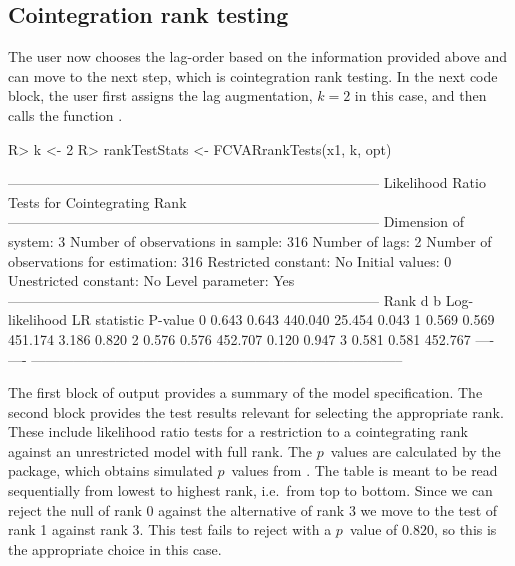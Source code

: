 \documentclass[article]{jss}
\newcommand{\fct}[1]{\code{#1()}}
\begin{document}
\subsection{Cointegration rank testing}

The user now chooses the lag-order based on the information provided above and can move to the next step, which is cointegration rank testing. 
In the next code block, the user first assigns the lag augmentation, $k = 2$ in this case, and then calls the function \fct{FCVARrankTests}. 


\begin{CodeChunk} 
\begin{CodeInput}
R> k <- 2
R> rankTestStats <- FCVARrankTests(x1, k, opt)
\end{CodeInput}
\begin{CodeOutput}
--------------------------------------------------------------------------------
             Likelihood Ratio Tests for Cointegrating Rank                               
--------------------------------------------------------------------------------
Dimension of system:       3     Number of observations in sample:          316 
Number of lags:            2     Number of observations for estimation:     316 
Restricted constant:      No     Initial values:                              0
Unestricted constant:     No     Level parameter:                           Yes
--------------------------------------------------------------------------------
Rank     d      b     Log-likelihood   LR statistic   P-value
 0     0.643  0.643          440.040         25.454     0.043
 1     0.569  0.569          451.174          3.186     0.820
 2     0.576  0.576          452.707          0.120     0.947
 3     0.581  0.581          452.767           ----      ----
--------------------------------------------------------------------------------
\end{CodeOutput}
\end{CodeChunk} 


The first block of output provides a summary of the model specification. The second block provides the test results relevant for selecting the appropriate rank. 
These include likelihood ratio tests for a restriction to a cointegrating rank against an unrestricted model with full rank. 
% 
The $p$~values are calculated by the  package, which obtains simulated $p$~values from \cite{mackinnon2014numerical}. 
% 
The table is meant to be read sequentially from lowest to highest rank, i.e.\ from top to bottom. Since we can reject the null of rank 0 against the alternative of rank 3 we move to the test of rank 1 against rank 3. This test fails to reject with a $p$~value of $0.820$, so this is the appropriate choice in this case.
\end{document}

